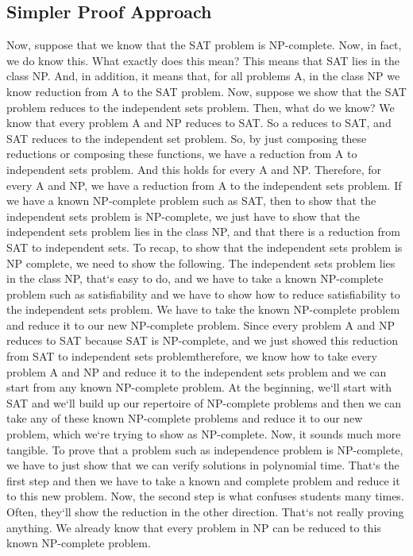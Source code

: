 \subsection{Simpler Proof Approach}
Now, suppose that we know that the SAT problem is NP-complete.
Now, in fact, we do know this.
What exactly does this mean? This means that SAT lies in the class NP\@.
And, in addition, it means that, for all problems A, in the class NP we know reduction from A to the SAT problem.
Now, suppose we show that the SAT problem reduces to the independent sets problem.
Then, what do we know? We know that every problem A and NP reduces to SAT\@.
So a reduces to SAT, and SAT reduces to the independent set problem.
So, by just composing these reductions or composing these functions, we have a reduction from A to independent sets problem.
And this holds for every A and NP\@.
Therefore, for every A and NP, we have a reduction from A to the independent sets problem.
If we have a known NP-complete problem such as SAT, then to show that the independent sets problem is NP-complete, we just have to show that the independent sets problem lies in the class NP, and that there is a reduction from SAT to independent sets.
To recap, to show that the independent sets problem is NP complete, we need to show the following.
The independent sets problem lies in the class NP, that`s easy to do, and we have to take a known NP-complete problem such as satisfiability and we have to show how to reduce satisfiability to the independent sets problem.
We have to take the known NP-complete problem and reduce it to our new NP-complete problem.
Since every problem A and NP reduces to SAT because SAT is NP-complete, and we just showed this reduction from SAT to independent sets problem\. therefore, we know how to take every problem A and NP and reduce it to the independent sets problem and we can start from any known NP-complete problem.
At the beginning, we`ll start with SAT and we`ll build up our repertoire of NP-complete problems and then we can take any of these known NP-complete problems and reduce it to our new problem, which we`re trying to show as NP-complete.
Now, it sounds much more tangible.
To prove that a problem such as independence problem is NP-complete, we have to just show that we can verify solutions in polynomial time.
That`s the first step and then we have to take a known and complete problem and reduce it to this new problem.
Now, the second step is what confuses students many times.
Often, they`ll show the reduction in the other direction.
That`s not really proving anything.
We already know that every problem in NP can be reduced to this known NP-complete problem.
